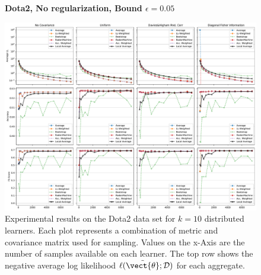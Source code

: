     \begin{landscape}
    \begin{figure}
        \centering
        \textbf{Dota2, No regularization, Bound $\epsilon=0.05$}\par\medskip
        \includegraphics[height=\dimexpr \textheight - 4\baselineskip\relax]{kapitel/figures/dota2_None_0.05.pdf}
        \caption[Dota2 plots without regularization and $\epsilon=0.05$]{Experimental results on the Dota2 data set for $k=10$ distributed learners. Each plot represents a combination of metric and covariance matrix used for sampling. Values on the x-Axis are the number of samples available on each learner. The top row shows the negative average log likelihood $\ell(\tilde{\vect{\theta}}; \mathcal{D})$ for each aggregate.}
        \label{fig:analysis11}
    \end{figure}
    \end{landscape}
